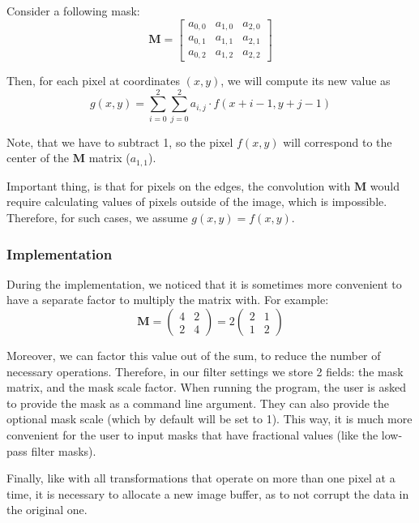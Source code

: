 \documentclass[12pt]{article}
\begin{document}
Consider a following mask:
\begin{equation}
    \mathbf{M} = \begin{bmatrix}
        a_{0,0} & a_{1,0} & a_{2,0} \\
        a_{0,1} & a_{1,1} & a_{2,1} \\
        a_{0,2} & a_{1,2} & a_{2,2}
    \end{bmatrix}
\end{equation}

Then, for each pixel at coordinates $(x,y)$, we will compute its new value as
\begin{equation}
    g(x,y) = \sum\limits_{i=0}^2 \sum\limits_{j=0}^2 a_{i,j} \cdot f(x + i - 1, y + j - 1)
\end{equation}

Note, that we have to subtract 1, so the pixel $f(x,y)$ will correspond to the center of the $\mathbf{M}$ matrix ($a_{1,1}$).

Important thing, is that for pixels on the edges,
the convolution with $\mathbf{M}$ would require calculating values of pixels outside of the image, which is impossible.
Therefore, for such cases, we assume $g(x,y) = f(x,y)$.

\subsubsection{Implementation}

During the implementation, we noticed that it is sometimes more convenient
to have a separate factor to multiply the matrix with.
For example:
\[
    \mathbf{M} = \begin{pmatrix}
        4 & 2 \\ 2 & 4
    \end{pmatrix} = 2 \begin{pmatrix}
        2 & 1 \\ 1 & 2
    \end{pmatrix}
\]

Moreover, we can factor this value out of the sum, to reduce the number of necessary operations.
Therefore, in our filter settings we store 2 fields: the mask matrix, and the mask scale factor.
When running the program, the user is asked to provide the mask as a command line argument.
They can also provide the optional mask scale (which by default will be set to 1).
This way, it is much more convenient for the user to input masks that have fractional values (like the low-pass filter masks).

Finally, like with all transformations that operate on more than one pixel at a time,
it is necessary to allocate a new image buffer, as to not corrupt the data in the original one.
\end{document}
